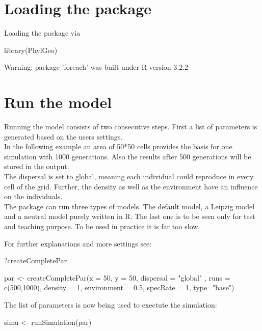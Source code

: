 \documentclass [a4paper]{tufte-book}\usepackage[]{graphicx}\usepackage[]{color}
\begin{document}
\section{Loading the package}

Loading the package via

\begin{Schunk}
\begin{Sinput}
library(PhylGeo)
\end{Sinput}
\begin{Soutput}
Warning: package 'foreach' was built under R version 3.2.2
\end{Soutput}
\end{Schunk}


\section{Run the model}
Running the model consists of two consecutive steps. First a list of parameters is generated based on the users settings.\\
In the following example an area of 50*50 cells provides the basis for one simulation with 1000 generations. Also the results after 500 generations will be stored in the output. \\
The dispersal is set to global, meaning each individual could reproduce in every cell
of the grid. Further, the density as well as the environment have an influence on the 
individuals.\\
The package can run three types of models. The default model, a Leipzig model and
a neutral model purely written in R. The last one is to be seen only for test and teaching purpose. To be used in practice it is far too slow.

For further explanations and more settings see:
\begin{Schunk}
\begin{Sinput}
?createCompletePar
\end{Sinput}
\end{Schunk}

\begin{Schunk}
\begin{Sinput}
par <- createCompletePar(x = 50, y = 50, dispersal = "global" , runs = c(500,1000), density = 1, environment = 0.5, specRate = 1, type="base")
\end{Sinput}
\end{Schunk}



The list of parameters is now being used to exectute the simulation:
\begin{Schunk}
\begin{Sinput}
simu <- runSimulation(par)
\end{Sinput}
\end{Schunk}
\end{document}
